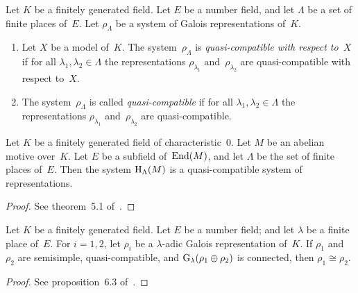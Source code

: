\documentclass[10pt,twoside,leqno]{article}
\numberwithin{equation}{subsection}
\newcommand{\End}{\textnormal{End}}
\newcommand{\HH}{\textnormal{H}}
\newcommand{\HLambda}{\HH_{\Lambda}}
\newcommand{\GG}{\textnormal{G}}
\newcommand{\Glambda}{\GG_{\lambda}}
\begin{document}
\begin{definition} %
 \label{quasi-compatible-system}
 Let $K$ be a finitely generated field.
 Let $E$ be a number field,
 and let $\Lambda$ be a set of finite places of~$E$.
 Let $\rho_{\Lambda}$ be a system of Galois representations of~$K$.
 \begin{enumerate}
  \item Let $X$ be a model of~$K$.
   The system~$\rho_{\Lambda}$ is
   \emph{quasi-compatible with respect to~$X$}
   if for all $\lambda_{1}, \lambda_{2} \in \Lambda$
   the representations $\rho_{\lambda_{1}}$ and~$\rho_{\lambda_{2}}$
   are quasi-compatible with respect to~$X$.
  \item The system~$\rho_{\Lambda}$ is called
   \emph{quasi-compatible}
   if for all $\lambda_{1}, \lambda_{2} \in \Lambda$
   the representations $\rho_{\lambda_{1}}$ and~$\rho_{\lambda_{2}}$
   are quasi-compatible.
 \end{enumerate}
\end{definition}

\begin{theorem} %
 \label{abelian-motive-quasi-compatible-realisations}
 Let $K$ be a finitely generated field of characteristic~$0$.
 Let $M$ be an abelian motive over~$K$.
 Let $E$ be a subfield of~$\End(M)$,
 and let $\Lambda$ be the set of finite places of~$E$.
 Then the system $\HLambda(M)$ is a quasi-compatible system of representations.
 \begin{proof}
  See theorem~5.1 of~\cite{Co17}.
 \end{proof}
\end{theorem}

\begin{proposition} %
 \label{quasi-compatible-semisimple-isomorphic}
 Let $K$ be a finitely generated field.
 Let $E$ be a number field; and
 let $\lambda$ be a finite place of~$E$.
 For $i = 1,2$,
 let $\rho_i$ be a $\lambda$-adic Galois representation of~$K$.
 If $\rho_1$ and~$\rho_2$ are semisimple, quasi-compatible,
 and $\Glambda(\rho_1 \oplus \rho_2)$ is connected,
 then $\rho_1 \cong \rho_2$.
 \begin{proof}
  See proposition~6.3 of~\cite{Co17}.
 \end{proof}
\end{proposition}
\end{document}
